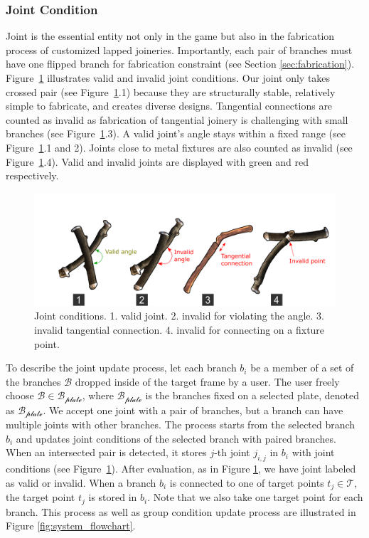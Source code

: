 \subsubsection{Joint Condition}
\label{sec:joint}
Joint is the essential entity not only in the game but also in the fabrication process of customized lapped joineries.
Importantly, each pair of branches must have one flipped branch for fabrication constraint (see Section \ref{sec:fabrication}).
Figure~\ref{fig:joint_condition} illustrates valid and invalid joint conditions.
Our joint only takes crossed pair (see Figure~\ref{fig:joint_condition}.1) because they are structurally stable, relatively simple to fabricate, and creates diverse designs.
Tangential connections are counted as invalid as fabrication of tangential joinery is challenging with small branches (see Figure~\ref{fig:joint_condition}.3).
A valid joint's angle stays within a fixed range (see Figure~\ref{fig:joint_condition}.1 and 2).
Joints close to metal fixtures are also counted as invalid (see Figure~\ref{fig:joint_condition}.4).
Valid and invalid joints are displayed with green and red respectively.

\begin{figure}[ht]
	\begin{center}
		\includegraphics[width = 0.4\paperwidth]{images/system/joint_conditions_2.png}
		\caption{Joint conditions. 1. valid joint. 2. invalid for violating the angle. 3. invalid tangential connection. 4. invalid for connecting on a fixture point. }
		\label{fig:joint_condition}
	\end{center}
\end{figure}




To describe the joint update process, let each branch $b_i$ be a member of a set of the branches $\mathcal{B}$ dropped inside of the target frame by a user.
The user freely choose $\mathcal{B} \in \mathcal{B_{plate}}$, where $\mathcal{B_{plate}}$ is the branches fixed on a selected plate, denoted as $\mathcal{B_{plate}}$.
We accept one joint with a pair of branches, but a branch can have multiple joints with other branches. 
The process starts from the selected branch $b_i$ and updates joint conditions of the selected branch with paired branches.
When an intersected pair is detected, it stores $j$-th joint $j_{i, j}$ in $b_i$ with joint conditions (see Figure~\ref{fig:joint_condition}).
After evaluation, as in Figure \ref{fig:joint_condition},  we have joint labeled as valid or invalid.
When a branch $b_i$ is connected to one of target points $t_j \in \mathcal{T}$, the target point $t_j$ is stored in $b_i$.
Note that we also take one target point for each branch.
This process as well as group condition update process are illustrated in Figure \ref{fig:system_flowchart}.

